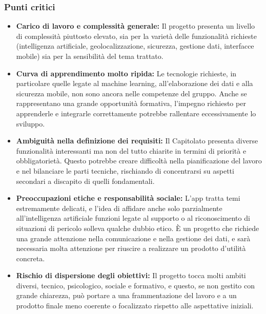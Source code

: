 \documentclass[a4paper,12pt]{article}
\begin{document}
\subsubsection{Punti critici}
\begin{itemize}
    \item \textbf{Carico di lavoro e complessità generale:} Il progetto presenta un livello di complessità piuttosto elevato, sia per la varietà delle funzionalità richieste (intelligenza artificiale, geolocalizzazione, sicurezza, gestione dati, interfacce mobile) sia per la sensibilità del tema trattato.
    \item \textbf{Curva di apprendimento molto ripida:} Le tecnologie richieste, in particolare quelle legate al machine learning, all’elaborazione dei dati e alla sicurezza mobile, non sono ancora nelle competenze del gruppo. Anche se rappresentano una grande opportunità formativa, l’impegno richiesto per apprenderle e integrarle correttamente potrebbe rallentare eccessivamente lo sviluppo.
    \item \textbf{Ambiguità nella definizione dei requisiti:} Il Capitolato presenta diverse funzionalità interessanti ma non del tutto chiarite in termini di priorità e obbligatorietà. Questo potrebbe creare difficoltà nella pianificazione del lavoro e nel bilanciare le parti tecniche, rischiando di concentrarsi su aspetti secondari a discapito di quelli fondamentali.
    \item \textbf{Preoccupazioni etiche e responsabilità sociale:} L’app tratta temi estremamente delicati, e l’idea di affidare anche solo parzialmente all’intelligenza artificiale funzioni legate al supporto o al riconoscimento di situazioni di pericolo solleva qualche dubbio etico. È un progetto che richiede una grande attenzione nella comunicazione e nella gestione dei dati, e sarà necessaria molta attenzione per riuscire a realizzare un prodotto d'utilità concreta.
    \item \textbf{Rischio di dispersione degli obiettivi:} Il progetto tocca molti ambiti diversi, tecnico, psicologico, sociale e formativo, e questo, se non gestito con grande chiarezza, può portare a una frammentazione del lavoro e a un prodotto finale meno coerente o focalizzato rispetto alle aspettative iniziali.
\end{itemize}
\end{document}
